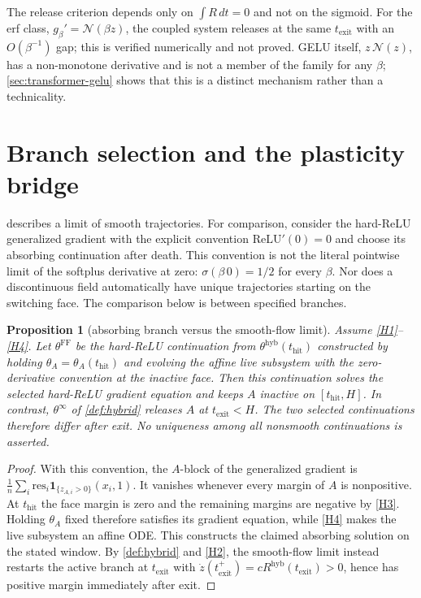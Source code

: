 \documentclass[11pt]{article}
\newtheorem{proposition}[proposition]{Proposition}
\theoremstyle{definition}
\theoremstyle{remark}
\newcommand{\thit}{t_{\mathrm{hit}}}
\newcommand{\texit}{t_{\mathrm{exit}}}
\newcommand{\hyb}{\mathrm{hyb}}
\begin{document}
The release criterion depends only on $\int R\,dt=0$ and not on the sigmoid. For
the erf class, $g_\beta'=\mathcal N(\beta z)$, the coupled system releases at the
same $\texit$ with an $O(\beta^{-1})$ gap; this is verified numerically and not
proved. GELU itself, $z\,\mathcal N(z)$, has a non-monotone derivative and is not
a member of the family for any $\beta$; \cref{sec:transformer-gelu} shows that
this is a distinct mechanism rather than a technicality.

\section{Branch selection and the plasticity bridge}\label{sec:noncomm}

 describes a limit of smooth trajectories. For comparison,
consider the hard-ReLU generalized gradient with the explicit convention
$\mathrm{ReLU}'(0)=0$ and choose its absorbing continuation after death.
This convention is not the literal pointwise limit of the softplus derivative
at zero: $\sigma(\beta\,0)=1/2$ for every $\beta$. Nor does a discontinuous
field automatically have unique trajectories starting on the switching face.
The comparison below is between specified branches.

\begin{proposition}[absorbing branch versus the smooth-flow limit]\label{prop:noncomm}
Assume \eqref{H1}--\eqref{H4}. Let $\theta^{\mathrm{FF}}$ be the hard-ReLU
continuation from $\theta^{\hyb}(\thit)$ constructed by holding
$\theta_A=\theta_A(\thit)$ and evolving the affine live subsystem with the
zero-derivative convention at the inactive face. Then this continuation solves
the selected hard-ReLU gradient equation and keeps $A$ inactive on $[\thit,H]$.
In contrast, $\theta^\infty$ of \cref{def:hybrid} releases $A$ at
$\texit<H$. The two selected continuations therefore differ after exit.
No uniqueness among all nonsmooth continuations is asserted.
\end{proposition}

\begin{proof}
With this convention, the $A$-block of the generalized gradient is
$\tfrac1n\sum_i\mathrm{res}_i\mathbf 1_{\{z_{A,i}>0\}}(x_i,1)$.
It vanishes whenever every margin of $A$ is nonpositive. At $\thit$ the
face margin is zero and the remaining margins are negative by \eqref{H3}.
Holding $\theta_A$ fixed therefore satisfies its gradient equation, while
\eqref{H4} makes the live subsystem an affine ODE. This constructs the claimed
absorbing solution on the stated window. By \cref{def:hybrid} and \eqref{H2},
the smooth-flow limit instead restarts the active branch at $\texit$ with
$\dot z(\texit^+)=cR^{\hyb}(\texit)>0$, hence has positive margin immediately
after exit.
\end{proof}
\end{document}
